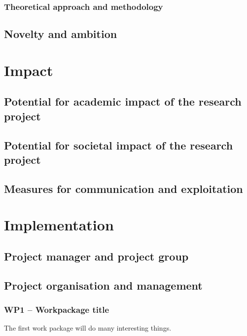 \documentclass[a4paper,11pt,english]{article}
\begin{document}
\subsubsection{Theoretical approach and methodology}

\subsection{Novelty and ambition}


\section{Impact}


\subsection{Potential for academic impact of the research project}



\subsection{Potential for societal impact of the research project}



\subsection{Measures for communication and exploitation}


\section{Implementation}

\subsection{Project manager and project group}


\subsection{Project organisation and management}


\subsubsection{WP1 -- Workpackage title}

The first work package will do many interesting things.
\end{document}
